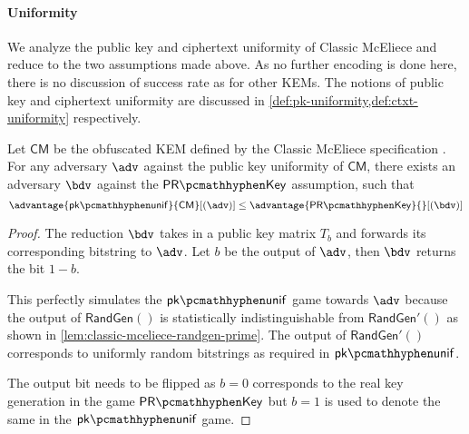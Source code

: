 \paragraph{Uniformity}

We analyze the public key and ciphertext uniformity of Classic McEliece and reduce to the two assumptions made above. As no further encoding is done here, there is no discussion of success rate as for other KEMs.
The notions of public key and ciphertext uniformity are discussed in \cref{def:pk-uniformity,def:ctxt-uniformity} respectively.

\begin{lemma} \label{lem:classic-mceliece-pk-unif}
    Let $\textsf{CM}$ be the obfuscated KEM defined by the Classic McEliece specification \cite{NISTPQC-R4:ClassicMcEliece22}.
    For any adversary $\adv$ against the public key uniformity of $\textsf{CM}$, there exists an adversary $\bdv$ against the $\prkey$ assumption, such that
    \[ \advantage{\pkunif}{\textsf{CM}}[(\adv)] \leq \advantage{\prkey}{}[(\bdv)] \]
\end{lemma}
\begin{proof}
    The reduction $\bdv$ takes in a public key matrix $T_b$ and forwards its corresponding bitstring to $\adv$. Let $b$ be the output of $\adv$, then $\bdv$ returns the bit $1-b$.

    This perfectly simulates the $\pkunif$ game towards $\adv$ because the output of $\textsf{RandGen}()$ is statistically indistinguishable from $\textsf{RandGen}'()$ as shown in \cref{lem:classic-mceliece-randgen-prime}. The output of $\textsf{RandGen}'()$ corresponds to uniformly random bitstrings as required in $\pkunif$.

    The output bit needs to be flipped as $b=0$ corresponds to the real key generation in the game $\prkey$ but $b=1$ is used to denote the same in the $\pkunif$ game.
\end{proof}

